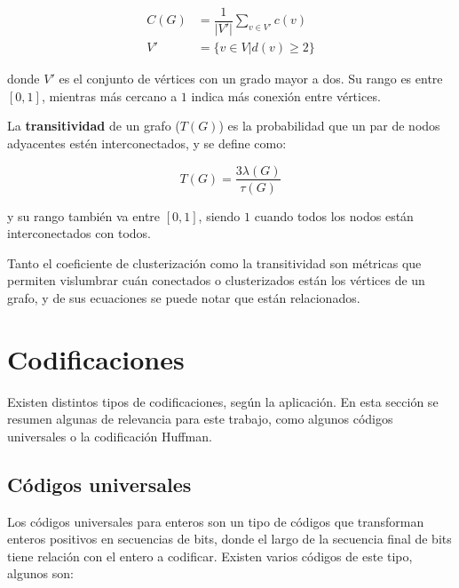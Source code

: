 \begin{align}
	C(G) &= \dfrac{1}{|V'|} \sum_{v \in V'} c(v) \label{eq:CC} \\
	V' &= \{ v \in V | d(v) \geq 2 \} \nonumber
\end{align}

\noindent donde $V'$ es el conjunto de vértices con un grado mayor a dos. Su rango es entre $[0, 1]$, mientras más cercano a $1$ indica más conexión entre vértices.

La \textbf{transitividad} de un grafo ($T(G)$) es la probabilidad que un par de nodos adyacentes estén interconectados, y se define como:

\begin{equation}
	T(G) = \dfrac{3 \lambda(G)}{\tau(G)} \label{eq:T} 
\end{equation}

\noindent y su rango también va entre $[0, 1]$, siendo $1$ cuando todos los nodos están interconectados con todos.

Tanto el coeficiente de clusterización como la transitividad son métricas que permiten vislumbrar cuán conectados o clusterizados están los vértices de un grafo, y de sus ecuaciones se puede notar que están relacionados.

\section{Codificaciones}

Existen distintos tipos de codificaciones, según la aplicación. En esta sección se resumen algunas de relevancia para este trabajo, como algunos códigos universales o la codificación Huffman.

\subsection{Códigos universales}\label{sec:Ucoding}
Los códigos universales para enteros son un tipo de códigos que transforman enteros positivos en secuencias de bits, donde el largo de la secuencia final de bits tiene relación con el entero a codificar. Existen varios códigos de este tipo, algunos son:

